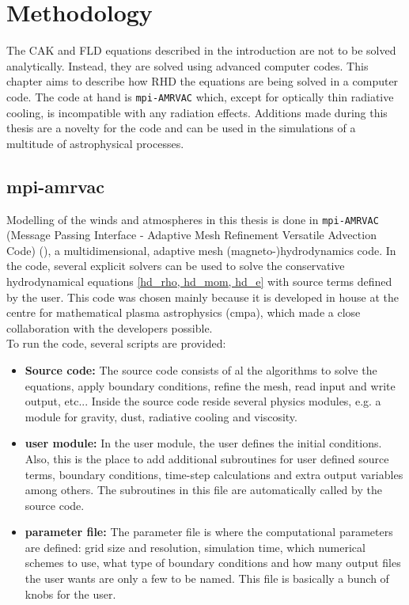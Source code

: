 \chapter{Methodology}
The CAK and FLD equations described in the introduction are not to be solved analytically. Instead, they are solved using advanced computer codes. This chapter aims to describe how RHD the equations are being solved in a computer code. The code at hand is \texttt{mpi-AMRVAC} which, except for optically thin radiative cooling, is incompatible with any radiation effects. Additions made during this thesis are a novelty for the code and can be used in the simulations of a multitude of astrophysical processes.

\section{mpi-amrvac} \label{section: methods amrvac}
Modelling of the winds and atmospheres in this thesis is done in \texttt{mpi-AMRVAC} (Message Passing Interface - Adaptive Mesh Refinement Versatile Advection Code) (\cite{Porth2014}), a multidimensional, adaptive mesh (magneto-)hydrodynamics code. In the code, several explicit solvers can be used to solve the conservative hydrodynamical equations \eqref{hd_rho, hd_mom, hd_e} with source terms defined by the user. This code was chosen mainly because it is developed in house at the centre for mathematical plasma astrophysics (cmpa), which made a close collaboration with the developers possible.\\
To run the code, several scripts are provided:

\begin{itemize}
\item \textbf{Source code:} The source code consists of al the algorithms to solve the equations, apply boundary conditions, refine the mesh, read input and write output, etc... Inside the source code reside several physics modules, e.g. a module for gravity, dust, radiative cooling and viscosity.\\

\item \textbf{user module:} In the user module, the user defines the initial conditions. Also, this is the place to add additional subroutines for user defined source terms, boundary conditions, time-step calculations and extra output variables among others. The subroutines in this file are automatically called by the source code.\\

\item \textbf{parameter file:} The parameter file is where the computational parameters are defined: grid size and resolution, simulation time, which numerical schemes to use, what type of boundary conditions and how many output files the user wants are only a few to be named. This file is basically a bunch of knobs for the user.\\
\end{itemize}

